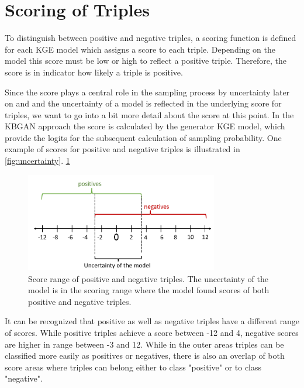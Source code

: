 \section{Scoring of Triples} \label{sec:scoring_of_triples}

To distinguish between positive and negative triples, a scoring function is defined for each \ac{KGE} model which assigns a score to each triple.
Depending on the model this score must be low or high to reflect a positive triple.
Therefore, the score is in indicator how likely a triple is positive.

Since the score plays a central role in the sampling process by uncertainty later on and and the uncertainty of a model is reflected in the underlying score for triples, we want to go into a bit more detail about the score at this point.
In the KBGAN approach the score is calculated by the generator \ac{KGE} model, which provide the logits for the subsequent calculation of sampling probability.
One example of scores for positive and negative triples is illustrated in \autoref{fig:uncertainty}.
\ref{fig:uncertainty}
\begin{figure}[t]
  \centering
    \includegraphics[width=0.75\textwidth]{figures/uncertainty.PNG}
  \caption{Score range of positive and negative triples.
  The uncertainty of the model is in the scoring range where the model found scores of both positive and negative triples.}
  \label{fig:uncertainty}
\end{figure}
It can be recognized that positive as well as negative triples have a different range of scores.
While positive triples achieve a score between -12 and 4, negative scores are higher in range between -3 and 12.
While in the outer areas triples can be classified more easily as positives or negatives, there is also an overlap of both score areas where triples can belong either to class "positive" or to class "negative".







